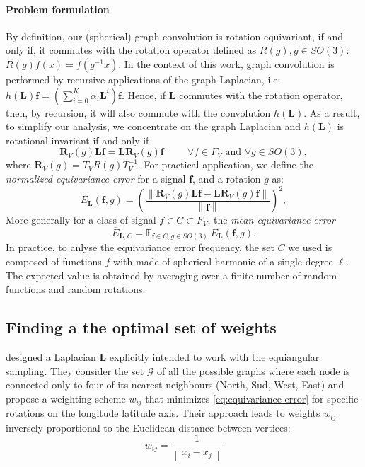 \documentclass{article} %
\newcommand{\norm}[1]{\left\lVert#1\right\rVert}
\renewcommand{\b}[1]{{\bm{#1}}}   %
\newcommand{\nati}[1]{{\color[rgb]{.3,.5,.9}{#1}}}
\begin{document}
\paragraph{Problem formulation} 
By definition, our (spherical) graph convolution is rotation equivariant, if and only if, it commutes with the rotation operator defined as $R(g), g\in SO(3)$: $R(g) f(x) = f\left(g^{-1} x \right)$. 
In the context of this work, graph convolution is performed by recursive applications of the graph Laplacian, i.e: $h(\b{L}) \b{f} = \left(\sum_{i=0}^K \alpha_i \b{L}^i\right) \b{f}$\nati{Put this equation somewhere else?}.  Hence, if $\b{L}$ commutes with the rotation operator, then, by recursion, it will also commute with the convolution $h(\b{L})$.
As a result, to simplify our analysis, we concentrate on the graph Laplacian and $h(\b{L})$ is rotational invariant if and only if 
\begin{equation} \label{eq:equivariance}
	\b{R}_V(g) \b{L} \b{f} = \b{L} \b{R}_V(g) \b{f} \hspace{1cm} \forall f\in F_V \text{ and } \forall g\in SO(3), 
\end{equation}
where $\b{R}_V(g) = T_V R(g) T_V^{-1}$. For practical application, we define the \textit{normalized equivariance error} for a signal $\b{f}$, and a  rotation $g$ as:
\begin{equation} \label{eq:equivariance error}
	E_{\b{L}}(\b{f}, g) = \left(\frac{ \norm {\b{R}_V(g) \b{L} \b{f} - \b{L} \b{R}_V(g) \b{f}} }{\norm {\b{f}}}\right)^2,
\end{equation}
More generally for a class of signal $f \in C \subset F_V$, the \textit{mean equivariance error}
\begin{equation} \label{eq:mean equivariance error}
	\overline E_{\b{L}, C} = \mathbb E_{\b{f}\in C, g\in SO(3)} \ E_{\b{L}}(\b{f}, g).
\end{equation}
In practice, to anlyse the equivariance error frequency,  the set $C$ we used is composed of functions $f$ with made of spherical harmonic of a single degree $\ell$.
The expected value is obtained by averaging over a finite number of random functions and random rotations. 

\subsection{Finding a the optimal set of weights}
\cite{khasanova2017graphomni} designed a Laplacian $\b{L}$ explicitly intended to work with the equiangular sampling. 
They consider the set $\mathcal{G}$ of all the possible graphs where each node is connected only to four of its nearest neighbours (North, Sud, West, East) and propose a weighting scheme $w_{ij}$ that minimizes \eqref{eq:equivariance error} for specific rotations on the longitude latitude axis.
Their approach leads to weights $w_{ij}$ inversely proportional to the Euclidean distance between vertices:
\begin{equation} \label{eq:frossard weights}
	w_{ij} = \frac{1}{\norm{x_i-x_j}}
\end{equation}
\end{document}
